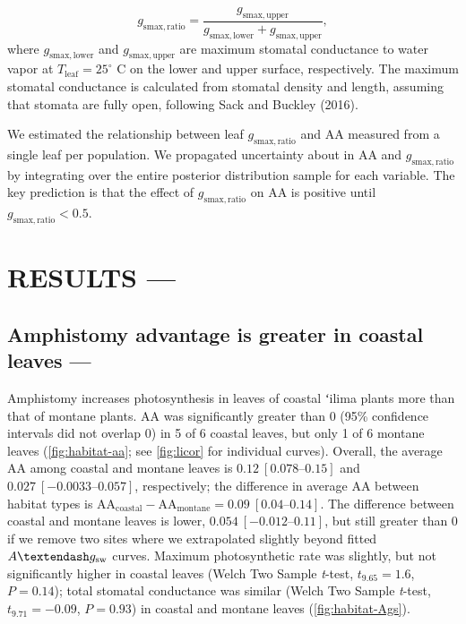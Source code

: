 \documentclass[
  letterpaper,
  DIV=11,
  numbers=noendperiod]{scrartcl}
\begin{document}
\[g_\mathrm{smax,ratio} = \frac{g_\mathrm{smax,upper}}{g_\mathrm{smax,lower} + g_\mathrm{smax,upper}},\]
where \(g_\mathrm{smax,lower}\) and \(g_\mathrm{smax,upper}\) are
maximum stomatal conductance to water vapor at
\(T_\mathrm{leaf} = 25 ^ \circ\) C on the lower and upper surface,
respectively. The maximum stomatal conductance is calculated from
stomatal density and length, assuming that stomata are fully open,
following Sack and Buckley (2016).

We estimated the relationship between leaf \(g_\mathrm{smax,ratio}\) and
\(\mathrm{AA}\) measured from a single leaf per population. We
propagated uncertainty about in \(\mathrm{AA}\) and
\(g_\mathrm{smax,ratio}\) by integrating over the entire posterior
distribution sample for each variable. The key prediction is that the
effect of \(g_\mathrm{smax,ratio}\) on \(\mathrm{AA}\) is positive until
\(g_\mathrm{smax,ratio} < 0.5\).

\hypertarget{results}{%
\section{RESULTS ---}\label{results}}

\hypertarget{amphistomy-advantage-is-greater-in-coastal-leaves}{%
\subsection{Amphistomy advantage is greater in coastal leaves
---}\label{amphistomy-advantage-is-greater-in-coastal-leaves}}

Amphistomy increases photosynthesis in leaves of coastal ʻilima plants
more than that of montane plants. \(\mathrm{AA}\) was significantly
greater than 0 (95\% confidence intervals did not overlap 0) in 5 of 6
coastal leaves, but only 1 of 6 montane leaves
(\autoref{fig:habitat-aa}; see \autoref{fig:licor} for individual
curves). Overall, the average \(\mathrm{AA}\) among coastal and montane
leaves is \(0.12~[\numrange{0.078}{0.15}]\) and
\(0.027~[\numrange{-0.0033}{0.057}]\), respectively; the difference in
average \(\mathrm{AA}\) between habitat types is
\(\mathrm{AA}_\text{coastal} - \mathrm{AA}_\text{montane} = 0.09~[\numrange{0.04}{0.14}]\).
The difference between coastal and montane leaves is lower,
\(0.054~[\numrange{-0.012}{0.11}]\), but still greater than 0 if we
remove two sites where we extrapolated slightly beyond fitted
\(A \textendash g_\mathrm{sw}\) curves. Maximum photosynthetic rate was
slightly, but not significantly higher in coastal leaves (Welch Two
Sample \emph{t}-test, \(t_{9.65} = 1.6\), \(P = 0.14\)); total stomatal
conductance was similar (Welch Two Sample \emph{t}-test,
\(t_{9.71} = -0.09\), \(P = 0.93\)) in coastal and montane leaves
(\autoref{fig:habitat-Ags}).
\end{document}
